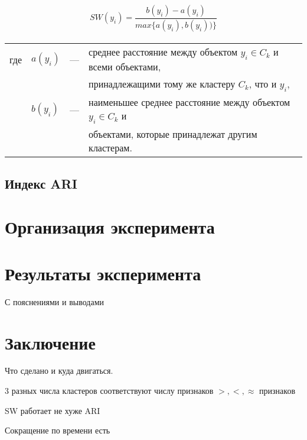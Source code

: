 \documentclass[12pt]{a&t}
\begin{document}
\begin{gather} \label{eq:ward-p-beta-distance}
SW(y_i) = \dfrac{b(y_i)-a(y_i)}{max\{a(y_i),b(y_i))\}}
\end{gather}

\begin{tabular}{llll}
	где & $ a(y_i) $ & {---} & среднее расстояние между объектом $ y_i \in C_k $ и всеми объектами, \\
	& & &	принадлежащими тому же кластеру $ C_k $, что и $ y_i $, \\
	& $ b(y_i) $ & {---} & наименьшее среднее расстояние между объектом $ y_i \in C_k $ и \\
	& & &  объектами, которые принадлежат другим кластерам. \\
\end{tabular}


\subsection{Индекс ARI}\label{sec:ari}

\section{Организация эксперимента}

\section{Результаты эксперимента}
С пояснениями и выводами

\section{Заключение}

Что сделано и куда двигаться.
\begin{enumlist} %
	\item
	3 разных числа кластеров соответствуют числу признаков $ >,<,\approx $ признаков	
	\item
	SW работает не хуже ARI
	\item
	Сокращение по времени есть
\end{enumlist}
\end{document}
